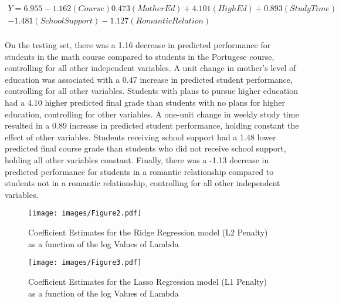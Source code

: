 \documentclass[sigconf]{acmart}
\begin{document}
\begin{equation*}
 \begin{aligned}
  Y = 6.955 - 1.162(Course) 0.473(MotherEd) + 4.101(HighEd) + 0.893(StudyTime) \\
    - 1.481(SchoolSupport) - 1.127(RomanticRelation) \\
 \end{aligned}
\end{equation*}


On the testing set, there was a 1.16 decrease in predicted performance 
for students in the math course compared to students in the Portugese course, 
controlling for all other independent variables. A unit change in mother's 
level of education was associated with a 0.47 increase in predicted student 
performance, controlling for all other variables. Students with plans to pursue
higher education had a 4.10 higher predicted final grade than students with 
no plans for higher education, controlling for other variables. A one-unit 
change in weekly study time resulted in a 0.89 increase in predicted student 
performance, holding constant the effect of other variables. Students receiving 
school support had a 1.48 lower predicted final course grade than students who 
did not receive school support, holding all other variables constant. Finally, 
there was a -1.13 decrease in predicted performance for students in a romantic 
relationship compared to students not in a romantic relationship, controlling
for all other independent variables. 


\begin{figure}[!ht]
  \centering\texttt{[image: images/Figure2.pdf]}
  \caption{Coefficient Estimates for the Ridge Regression model 
  (L2 Penalty) as a function of the log Values of Lambda}
  \label{f:Figure2}
\end{figure}

\begin{figure}[!ht]
  \centering\texttt{[image: images/Figure3.pdf]}
  \caption{Coefficient Estimates for the Lasso Regression model 
  (L1 Penalty) as a function of the log Values of Lambda}
  \label{f:Figure3}
\end{figure}

\end{document}
